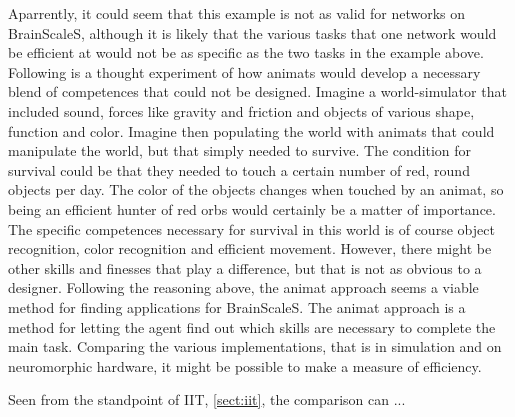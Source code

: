 Aparrently, it could seem that this example is not as valid for networks on BrainScaleS, although it is likely that the various tasks that one network would be efficient at would not be as specific as the two tasks in the example above.
Following is a thought experiment of how animats would develop a necessary blend of competences that could not be designed.
Imagine a world-simulator that included sound, forces like gravity and friction and objects of various shape, function and color.
Imagine then populating the world with animats that could manipulate the world, but that simply needed to survive.
The condition for survival could be that they needed to touch a certain number of red, round objects per day.
The color of the objects changes when touched by an animat, so being an efficient hunter of red orbs would certainly be a matter of importance.
The specific competences necessary for survival in this world is of course object recognition, color recognition and efficient movement.
However, there might be other skills and finesses that play a difference, but that is not as obvious to a designer.
Following the reasoning above, the animat approach seems a viable method for finding applications for BrainScaleS.
The animat approach is a method for letting the agent find out which skills are necessary to complete the main task.
Comparing the various implementations, that is in simulation and on neuromorphic hardware, it might be possible to make a measure of efficiency.

Seen from the standpoint of IIT, \vref{sect:iit}, the comparison can ...

